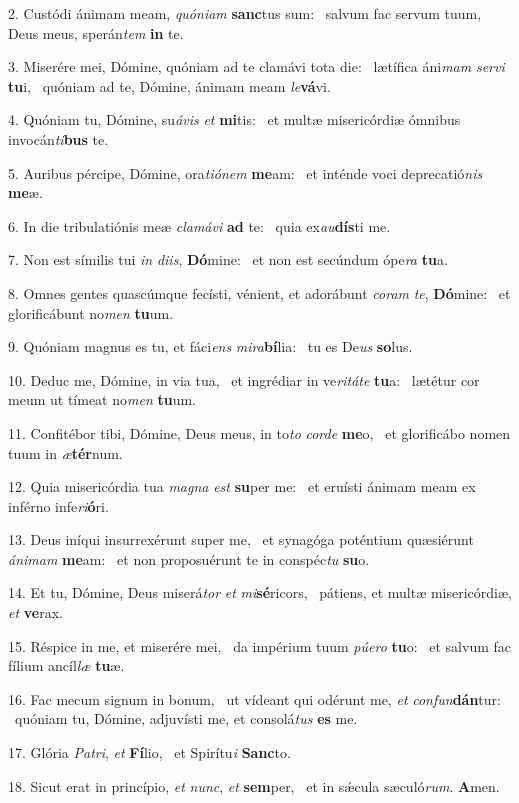 2. Custódi ánimam meam, \textit{quón}\textit{i}\textit{am} \textbf{sanc}tus sum: \ast\  salvum fac servum tuum, Deus meus, sperán\textit{tem} \textbf{in} te.\

3. Miserére mei, Dómine, quóniam ad te clamávi tota die: \dag\  lætífica áni\textit{mam} \textit{ser}\textit{vi} \textbf{tu}i, \ast\  quóniam ad te, Dómine, ánimam meam \textit{le}\textbf{vá}vi.\

4. Quóniam tu, Dómine, su\textit{á}\textit{vis} \textit{et} \textbf{mi}tis: \ast\  et multæ misericórdiæ ómnibus invocán\textit{ti}\textbf{bus} te.\

5. Auribus pércipe, Dómine, ora\textit{ti}\textit{ó}\textit{nem} \textbf{me}am: \ast\  et inténde voci deprecatió\textit{nis} \textbf{me}æ.\

6. In die tribulatiónis meæ \textit{cla}\textit{má}\textit{vi} \textbf{ad} te: \ast\  quia ex\textit{au}\textbf{dís}ti me.\

7. Non est símilis tui \textit{in} \textit{di}\textit{is}, \textbf{Dó}mine: \ast\  et non est secúndum ópe\textit{ra} \textbf{tu}a.\

8. Omnes gentes quascúmque fecísti, vénient, et adorábunt \textit{co}\textit{ram} \textit{te}, \textbf{Dó}mine: \ast\  et glorificábunt no\textit{men} \textbf{tu}um.\

9. Quóniam magnus es tu, et fáci\textit{ens} \textit{mi}\textit{ra}\textbf{bí}lia: \ast\  tu es De\textit{us} \textbf{so}lus.\

10. Deduc me, Dómine, in via tua, \dag\  et ingrédiar in ve\textit{ri}\textit{tá}\textit{te} \textbf{tu}a: \ast\  lætétur cor meum ut tímeat no\textit{men} \textbf{tu}um.\

11. Confitébor tibi, Dómine, Deus meus, in to\textit{to} \textit{cor}\textit{de} \textbf{me}o, \ast\  et glorificábo nomen tuum in \textit{æ}\textbf{tér}num.\

12. Quia misericórdia tua \textit{ma}\textit{gna} \textit{est} \textbf{su}per me: \ast\  et eruísti ánimam meam ex inférno infe\textit{ri}\textbf{ó}ri.\

13. Deus iníqui insurrexérunt super me, \dag\  et synagóga poténtium quæsiérunt \textit{á}\textit{ni}\textit{mam} \textbf{me}am: \ast\  et non proposuérunt te in conspéc\textit{tu} \textbf{su}o.\

14. Et tu, Dómine, Deus miserá\textit{tor} \textit{et} \textit{mi}\textbf{sé}ricors, \ast\  pátiens, et multæ misericórdiæ, \textit{et} \textbf{ve}rax.\

15. Réspice in me, et miserére mei, \dag\  da impérium tuum \textit{pú}\textit{e}\textit{ro} \textbf{tu}o: \ast\  et salvum fac fílium ancíl\textit{læ} \textbf{tu}æ.\

16. Fac mecum signum in bonum, \dag\  ut vídeant qui odérunt me, \textit{et} \textit{con}\textit{fun}\textbf{dán}tur: \ast\  quóniam tu, Dómine, adjuvísti me, et consolá\textit{tus} \textbf{es} me.\

17. Glória \textit{Pa}\textit{tri}, \textit{et} \textbf{Fí}lio, \ast\  et Spirítu\textit{i} \textbf{Sanc}to.\

18. Sicut erat in princípio, \textit{et} \textit{nunc}, \textit{et} \textbf{sem}per, \ast\  et in sǽcula sæculó\textit{rum}. \textbf{A}men.\

